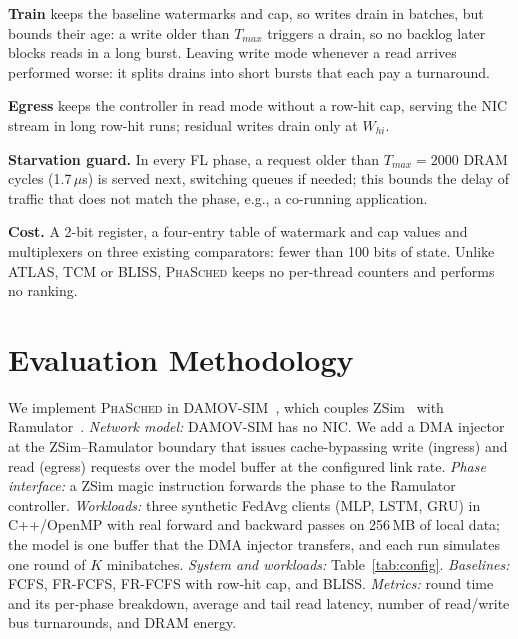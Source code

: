 \documentclass[conference]{IEEEtran}
\newcommand{\name}{\textsc{PhaSched}}
\begin{document}
\textbf{Train} keeps the baseline watermarks and cap, so writes drain in batches, but bounds their age: a write older than $T_{max}$ triggers a drain, so no backlog later blocks reads in a long burst. Leaving write mode whenever a read arrives performed worse: it splits drains into short bursts that each pay a turnaround.

\textbf{Egress} keeps the controller in read mode without a row-hit cap, serving the NIC stream in long row-hit runs; residual writes drain only at $W_{hi}$.

\textbf{Starvation guard.} In every FL phase, a request older than $T_{max}=2000$ DRAM cycles (1.7\,$\mu$s) is served next, switching queues if needed; this bounds the delay of traffic that does not match the phase, e.g., a co-running application.

\textbf{Cost.} A 2-bit register, a four-entry table of watermark and cap values and multiplexers on three existing comparators: fewer than 100 bits of state. Unlike ATLAS, TCM or BLISS, \name{} keeps no per-thread counters and performs no ranking.
\section{Evaluation Methodology}
We implement \name{} in DAMOV-SIM~\cite{damov}, which couples ZSim~\cite{zsim} with Ramulator~\cite{ramulator}. \emph{Network model:} DAMOV-SIM has no NIC. We add a DMA injector at the ZSim--Ramulator boundary that issues cache-bypassing write (ingress) and read (egress) requests over the model buffer at the configured link rate. \emph{Phase interface:} a ZSim magic instruction forwards the phase to the Ramulator controller.  \emph{Workloads:} three synthetic FedAvg clients (MLP, LSTM, GRU) in C++/OpenMP with real forward and backward passes on 256\,MB of local data; the model is one buffer that the DMA injector transfers, and each run simulates one round of $K$ minibatches.
\emph{System and workloads:} Table~\ref{tab:config}. \emph{Baselines:} FCFS, FR-FCFS, FR-FCFS with row-hit cap, and BLISS. \emph{Metrics:} round time and its per-phase breakdown, average and tail read latency, number of read/write bus turnarounds, and DRAM energy.
\end{document}
